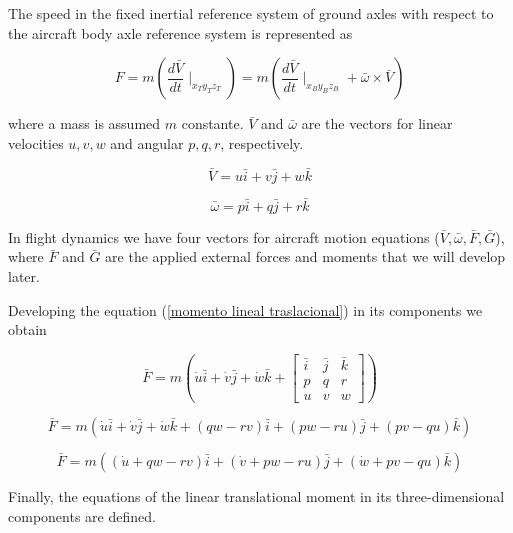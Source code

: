 The speed in the fixed inertial reference system of ground axles with respect to the aircraft body axle reference system is represented as

\begin{equation}
\label{momento lineal traslacional}
    F = m ( \frac{d \bar{V}}{dt}\mid_{x_{T} y_{T} z_{T}}) = m (\frac{d \bar{V}}{dt}\mid_{x_{B} y_{B} z_{B}} + \bar{\omega} \times \bar{V} )
\end{equation}

where a mass is assumed $m$ constante. $\bar{V}$ and $\bar{\omega}$ are the vectors for linear velocities $u,v,w$ and angular $p,q,r$, respectively.

\begin{equation}
    \bar{V} = u\bar{i}+v\bar{j}+w\bar{k} 
\end{equation}

\begin{equation}
    \bar{\omega} = p\bar{i}+q\bar{j}+r\bar{k} 
\end{equation}


In flight dynamics we have four vectors for aircraft motion equations ($\bar{V}, \bar{\omega}, \bar{F}, \bar{G}$), where $\bar{F}$ and $\bar{G}$ are the applied external forces and moments that we will develop later. 

\medskip

Developing the equation (\ref{momento lineal traslacional}) in its components we obtain

\begin{equation}
    \bar{F} = m(\dot{u}\bar{i}+\dot{v}\bar{j}+\dot{w}\bar{k}+\begin{bmatrix}
    \bar{i} & \bar{j} & \bar{k} \\
    p & q & r \\
    u & v & w
    \end{bmatrix}) 
\end{equation}


\begin{equation}
    \bar{F} = m(\dot{u}\bar{i}+\dot{v}\bar{j}+\dot{w}\bar{k}+
    (qw-rv)\bar{i} + (pw-ru)\bar{j} + (pv-qu)\bar{k}) 
\end{equation}

\begin{equation}
    \bar{F} = m((\dot{u}+qw-rv)\bar{i} + (\dot{v}+pw-ru)\bar{j} + (\dot{w}+pv-qu)\bar{k}) 
\end{equation}

Finally, the equations of the linear translational moment in its three-dimensional components are defined.

